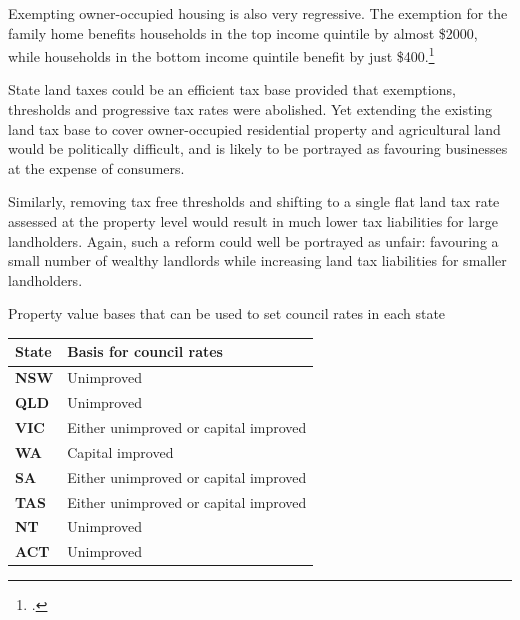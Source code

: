 \documentclass[twoside,english]{palatinob5ona4portrait}
\begin{document}
Exempting owner-occupied housing is also very regressive. The exemption for the family home benefits households in the top income quintile by almost \$2000, while households in the bottom income quintile benefit by just \$400.\footcite[][27]{KellyMaresHarrisonEtAl2013}   

State land taxes could be an efficient tax base provided that exemptions, thresholds and progressive tax rates were abolished. Yet extending the existing land tax base to cover owner-occupied residential property and agricultural land would be politically difficult, and is likely to be portrayed as favouring businesses at the expense of consumers.

Similarly, removing tax free thresholds and shifting to a single flat land tax rate assessed at the property level would result in much lower tax liabilities for large landholders. Again, such a reform could well be portrayed as unfair: favouring a small number of wealthy landlords while increasing land tax liabilities for smaller landholders. 

\begin{table}
%
{Property value bases that can be used to set council rates in each state}
\begin{tabularx}{\columnwidth}{>{\bfseries}lX}
%
\toprule
\textbf{State} & \textbf{Basis for council rates} \\%
\midrule
\textbf{NSW} & Unimproved  \\[0.5\baselineskip]
\textbf{QLD} & Unimproved  \\[0.5\baselineskip]
\textbf{VIC} & Either unimproved or capital improved  \\[0.5\baselineskip]
\textbf{WA} & Capital improved  \\[0.5\baselineskip]
\textbf{SA} & Either unimproved or capital improved \\[0.5\baselineskip]
\textbf{TAS} & Either unimproved or capital improved  \\[0.5\baselineskip]
\textbf{NT} & Unimproved  \\[0.5\baselineskip]
\textbf{ACT} & Unimproved  \\%
\bottomrule
\end{tabularx}

\end{table}
\end{document}
